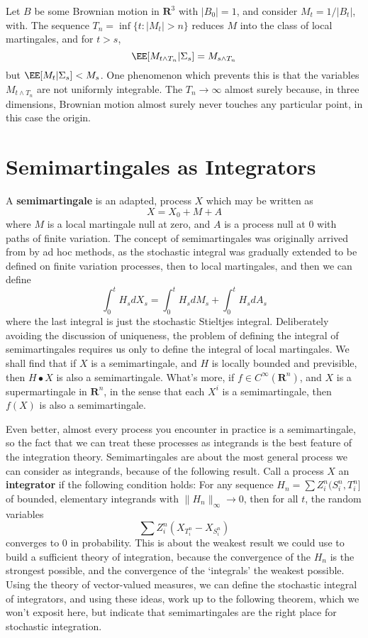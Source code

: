 \begin{example}
    Let $B$ be some Brownian motion in $\mathbf{R}^3$ with $|B_0| = 1$, and consider $M_t = 1/|B_t|$, with. The sequence $T_n = \inf \{ t : |M_t| > n \}$ reduces $M$ into the class of local martingales, and for $t > s$,
    \[ \EE[M_{t \wedge T_n} | \Sigma_s] = M_{s \wedge T_n} \]
    but $\EE[M_t | \Sigma_s ] < M_s$. One phenomenon which prevents this is that the variables $M_{t \wedge T_n}$ are not uniformly integrable. The $T_n \to \infty$ almost surely because, in three dimensions, Brownian motion almost surely never touches any particular point, in this case the origin.
\end{example}

\section{Semimartingales as Integrators}

A {\bf semimartingale} is an adapted, process $X$ which may be written as
%
\[ X = X_0 + M + A \]
%
where $M$ is a local martingale null at zero, and $A$ is a process null at 0 with paths of finite variation. The concept of semimartingales was originally arrived from by ad hoc methods, as the stochastic integral was gradually extended to be defined on finite variation processes, then to local martingales, and then we can define
%
\[ \int_0^t H_s dX_s = \int_0^t H_s dM_s + \int_0^t H_s dA_s \]
%
where the last integral is just the stochastic Stieltjes integral. Deliberately avoiding the discussion of uniqueness, the problem of defining the integral of semimartingales requires us only to define the integral of local martingales. We shall find that if $X$ is a semimartingale, and $H$ is locally bounded and previsible, then $H \bullet X$ is also a semimartingale. What's more, if $f \in C^\infty(\mathbf{R}^n)$, and $X$ is a supermartingale in $\mathbf{R}^n$, in the sense that each $X^i$ is a semimartingale, then $f(X)$ is also a semimartingale.

Even better, almost every process you encounter in practice is a semimartingale, so the fact that we can treat these processes as integrands is the best feature of the integration theory. Semimartingales are about the most general process we can consider as integrands, because of the following result. Call a process $X$ an {\bf integrator} if the following condition holds: For any sequence $H_n = \sum Z^n_i (S^n_i, T^n_i]$ of bounded, elementary integrands with $\| H_n \|_\infty \to 0$, then for all $t$, the random variables
%
\[ \sum Z^n_i \left( X_{T^n_i} - X_{S^n_i} \right) \]
%
converges to 0 in probability. This is about the weakest result we could use to build a sufficient theory of integration, because the convergence of the $H_n$ is the strongest possible, and the convergence of the `integrals' the weakest possible. Using the theory of vector-valued measures, we can define the stochastic integral of integrators, and using these ideas, work up to the following theorem, which we won't exposit here, but indicate that semimartingales are the right place for stochastic integration.

